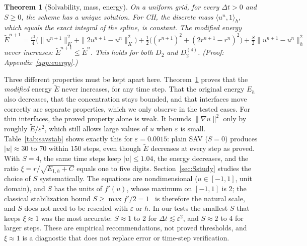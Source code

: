 \documentclass[preprint,12pt]{elsarticle}
\newtheorem{theorem}{Theorem}
\theoremstyle{remark}
\newcommand{\proofin}[1]{\hfill{\small\emph{(Proof: Appendix~\ref{#1}.)}}}
\begin{document}
\begin{theorem}[Solvability, mass, energy]\label{thm:energy}
On a uniform grid, for every $\Delta t>0$ and $S\ge0$, the scheme has a unique solution. For CH, the
discrete mass $\langle u^n,1\rangle_h$, which equals the exact integral of the spline, is constant. The
modified energy
\[
\tilde E^{n+1}=\tfrac{\varepsilon^2}{4}\big(\|u^{n+1}\|_K^2+\|2u^{n+1}-u^n\|_K^2\big)
+\tfrac12\big((r^{n+1})^2+(2r^{n+1}-r^n)^2\big)+\tfrac S2\|u^{n+1}-u^n\|_h^2
\]
never increases: $\tilde E^{n+1}\le\tilde E^n$. This holds for both $D_2$ and $D_2^{(4)}$.
\proofin{app:energy}
\end{theorem}

Three different properties must be kept apart here. Theorem~\ref{thm:energy} proves that the
\emph{modified} energy $\tilde E$ never increases, for any time step. That the original energy $E_h$ also
decreases, that the concentration stays bounded, and that interfaces move correctly are separate
properties, which we only observe in the tested cases. For thin interfaces, the proved property alone is
weak. It bounds $\|\nabla u\|^2$ only by
roughly $\tilde E/\varepsilon^2$, which still allows large values of $u$ when $\varepsilon$ is small.
Table~\ref{tab:savstab} shows exactly this for $\varepsilon=0.0015$: plain SAV ($S=0$) produces
$|u|\approx30$ to $70$ within 150 steps, even though $\tilde E$ decreases at every step as proved. With
$S=4$, the same time steps keep $|u|\le1.04$, the energy decreases, and the ratio
$\xi=r/\sqrt{E_{1,h}+C}$ equals one to five digits. Section~\ref{sec:Sstudy} studies the choice of $S$ systematically. The equations are nondimensional
($u\in[-1,1]$, unit domain), and $S$ has the units of $f'(u)$, whose maximum on $[-1,1]$ is 2; the
classical stabilization bound $S\ge\max f'/2=1$~\cite{shen2010numerical} is therefore the natural scale,
and $S$ does not need to be rescaled with $\varepsilon$ or $h$. In our tests the smallest $S$ that keeps
$\xi\approx1$ was the most accurate: $S\approx1$ to 2 for $\Delta t\lesssim\varepsilon^2$, and $S\approx2$ to
4 for larger steps. These are empirical recommendations, not proved thresholds, and $\xi\approx1$ is a
diagnostic that does not replace error or time-step verification.
\end{document}
